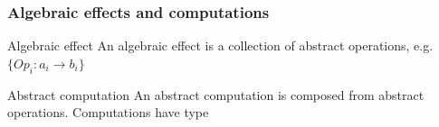\begin{frame}
  \frametitle{Algebraic effects and computations}
  \begin{definition}{Algebraic effect}
    An algebraic effect is a collection of abstract operations, e.g. 
    $\{ Op_i : a_i \to b_i \}$
  \end{definition}
  \begin{definition}{Abstract computation}
    An abstract computation is composed from abstract operations. Computations have type
  \end{definition}

\end{frame}




